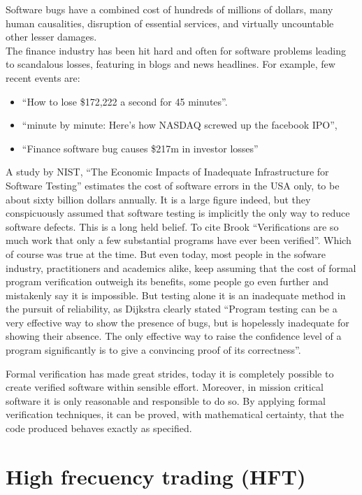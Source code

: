 \documentclass{tufte-book} %
\begin{document}
Software bugs have a combined cost of hundreds of millions of dollars, many human causalities, disruption of essential services, and virtually uncountable other lesser damages.\\

The finance industry has been hit hard and often for software problems leading to scandalous losses, featuring in blogs and news headlines. For example, few recent events are:
\begin{itemize}
\item  ``How to lose \$172,222 a second for 45 minutes''.
\item ``minute by minute: Here's how NASDAQ screwed up the facebook IPO'',
\item ``Finance software bug causes \$217m in investor losses''
\end{itemize}

A study by NIST, ``The Economic Impacts of Inadequate Infrastructure for Software Testing''\cite{Tassey2002} estimates the cost of software errors in the USA only, to be about sixty billion dollars annually. It is a large figure indeed, but they conspicuously assumed that software testing is implicitly the only way to reduce software defects. This is a long held belief. To cite Brook \cite{Brooks1995} ``Verifications are so much work that only a few substantial programs have ever been verified''. Which of course was true at the time. But even today, most people in the sofware industry, practitioners and academics alike, keep assuming that the cost of formal program verification outweigh its benefits, some people go even further and mistakenly say it is impossible. But testing alone it is an inadequate method in the pursuit of reliability, as Dijkstra clearly stated \cite{Dijkstra1972} ``Program testing can be a very effective way to show the presence of bugs, but is hopelessly inadequate for showing their absence. The only effective way to raise the confidence level of a program significantly is to give a convincing proof of its correctness''.

Formal verification has made great strides, today it is completely possible to create verified software within sensible effort. Moreover, in mission critical software it is only reasonable and responsible to do so. By applying formal verification techniques, it can be proved, with mathematical certainty, that the code produced behaves exactly as specified.

\newpage
\section{High frecuency trading (HFT)}
\end{document}
